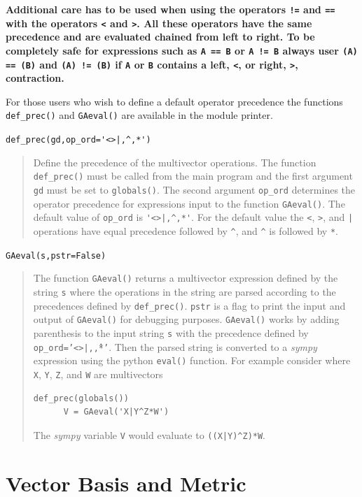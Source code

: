 \documentclass[12pt]{report}
\newcommand{\T}[1]{\texttt{#1}}
\begin{document}
    \textbf{Additional care has to be used when using the operators \T{!=} and \T{==} with
    the operators \T{<} and \T{>}.  All these operators have the same precedence and are
    evaluated chained from left to right.  To be completely safe for expressions such as
    \T{A == B} or \T{A != B} always user \T{(A) == (B)} and \T{(A) != (B)} if \T{A} or \T{B}
    contains a left, \T{<}, or right, \T{>}, contraction.}

For those users who wish to define a default operator precedence the functions
\T{def\_prec()} and \T{GAeval()} are available in the module printer.

   \lstinline$def_prec(gd,op_ord='<>|,^,*')$
   \begin{quote}
   Define the precedence of the multivector operations.  The function
   \T{def\_prec()} must be called from the main program and the
   first argument \T{gd} must be set to \T{globals()}.  The second argument
   \T{op\_ord} determines the operator precedence for expressions input to
   the function \T{GAeval()}. The default value of \T{op\_ord} is \lstinline$'<>|,^,*'$.
   For the default value the \T{<}, \T{>}, and \T{|} operations have equal
   precedence followed by \T{\^}, and \T{\^} is followed by \T{*}.
   \end{quote}

   \T{GAeval(s,pstr=False)}
   \begin{quote}
   The function \T{GAeval()} returns a multivector expression defined by the
   string \T{s} where the operations in the string are parsed according to
   the precedences defined by \T{def\_prec()}. \T{pstr} is a flag
   to print the input and output of \T{GAeval()} for debugging purposes.
   \T{GAeval()} works by adding parenthesis to the input string \T{s} with the
   precedence defined by \T{op\_ord='<>|,\^,*'}.  Then the parsed string is
   converted to a \emph{sympy} expression using the python \T{eval()} function.
   For example consider where \T{X}, \T{Y}, \T{Z}, and \T{W} are multivectors

    \begin{lstlisting}[numbers=none]
      def_prec(globals())
      V = GAeval('X|Y^Z*W')
    \end{lstlisting}

   The \emph{sympy} variable \T{V} would evaluate to \lstinline!((X|Y)^Z)*W!.
   \end{quote}

\section{Vector Basis and Metric}\label{BasisMetric}
\end{document}
